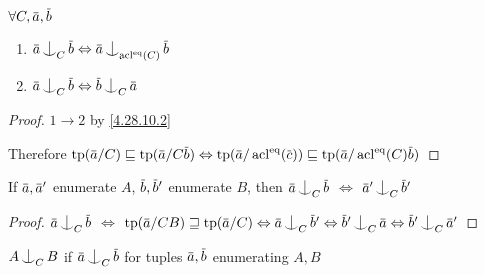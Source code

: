 \documentclass[11pt]{article}
\begin{document}
\begin{lemma}[]
\(\forall C,\bara,\barb\)
\begin{enumerate}
\item \(\bara\ind_C\barb\Leftrightarrow\bara\ind_{\acl^{\eq}(C)}\barb\)
\item \(\bara\ind_C\barb\Leftrightarrow\barb\ind_C\bara\)
\end{enumerate}
\end{lemma}

\begin{proof}
\(1\to 2\) by \ref{4.28.10.2}

\begin{center}\end{center}

Therefore \(\tp(\bara/C)\sqsubseteq\tp(\bara/C\barb)\Leftrightarrow\tp(\bara/\acl^{\eq}(\barc))\sqsubseteq\tp(\bara/\acl^{\eq}(C)\barb)\)
\end{proof}

\begin{lemma}[]
If \(\bara,\bara'\) enumerate \(A\), \(\barb,\barb'\) enumerate \(B\), then
\(\bara\ind_C\barb\) \(\Leftrightarrow\) \(\bara'\ind_C\barb'\)
\end{lemma}

\begin{proof}
\(\bara\ind_C\barb\) \(\Leftrightarrow\) \(\tp(\bara/CB)\sqsupseteq\tp(\bara/C)\Leftrightarrow\bara\ind_C\barb'\Leftrightarrow\barb'\ind_C\bara\Leftrightarrow\barb'\ind_C\bara'\)
\end{proof}

\begin{definition}[]
\(A\ind_CB\) if \(\bara\ind_C\barb\) for tuples \(\bara,\barb\) enumerating \(A,B\)
\end{definition}
\end{document}
